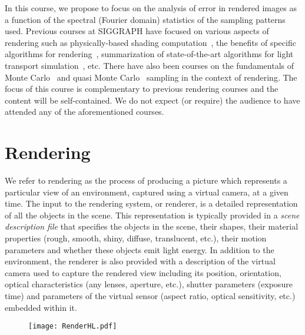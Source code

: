 \documentclass[11pt,fleqn]{book} %
\newcommand{\TBC} {\noindent [TO BE COMPLETED IN THE FINAL VERSION.] }
\begin{document}
In this course, we propose to focus on the analysis of error in rendered images as a function of the spectral (Fourier domain) statistics of the sampling patterns used.  Previous courses at SIGGRAPH have focused on various aspects of rendering such as physically-based shading computation~\cite{Hill:2015:PBSCourse}, the benefits of specific algorithms for rendering~\cite{Keller:2015:PTRCourse,hachisuka13starpm}, summarization of state-of-the-art algorithms for light transport simulation~\cite{Krivanek:2014:RALCourse}, etc. There have also been courses on the fundamentals of Monte Carlo~\cite{Jensen2003Course} and quasi Monte Carlo~\cite{Keller:2012:AMCCourse} sampling in the context of rendering. The focus of this course is complementary to previous rendering courses and the content will be self-contained. We do not expect (or require) the audience to have attended any of the aforementioned courses.


\section{Rendering}
We refer to rendering as the process of producing a picture which represents a particular view of an environment, captured using a virtual camera, at a given time. The input to the rendering system, or renderer, is a detailed representation of all the objects in the scene. This representation is typically provided in a \textit{scene description file} that specifies the objects in the scene, their shapes, their material properties (rough, smooth, shiny, diffuse, translucent, etc.), their motion parameters and whether these objects emit light energy. In addition to the environment, the renderer is also provided with a description of the virtual camera used to capture the rendered view including its position, orientation, optical characteristics (any lenses, aperture, etc.), shutter parameters (exposure time)  and parameters of the virtual sensor (aspect ratio, optical sensitivity, etc.) embedded within it. 

\TBC 
\begin{figure}
 \centering
 {
  \texttt{[image: RenderHL.pdf]}
 }
 \caption{}
\end{figure}
\end{document}
